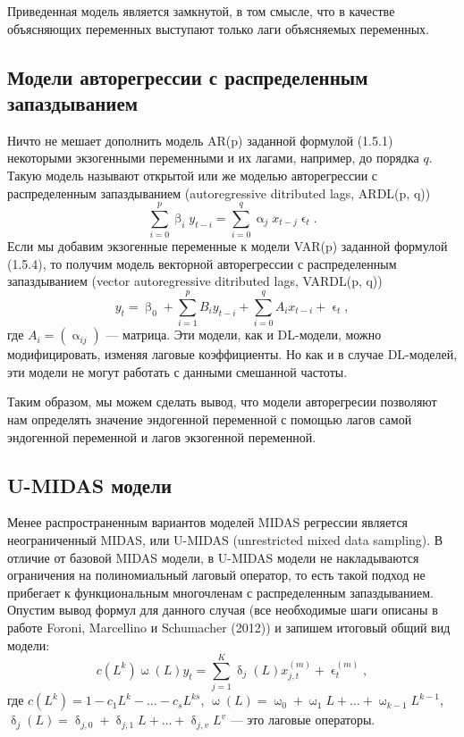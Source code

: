 \documentclass[a4paper, 12pt]{extarticle}
\numberwithin{equation}{subsection}
\renewcommand{\alpha}{\upalpha}
\renewcommand{\beta}{\upbeta}
\renewcommand{\delta}{\updelta}
\renewcommand{\omega}{\upomega}
\renewcommand{\epsilon}{\upvarepsilon}
\begin{document}
	Приведенная модель является замкнутой, в том смысле, что в качестве объясняющих переменных выступают только лаги объясняемых переменных. 
	\subsection{Модели авторегрессии с распределенным запаздыванием}
	Ничто не мешает дополнить модель AR(p) заданной формулой (1.5.1) некоторыми экзогенными переменными и их лагами, например, до порядка $q$. Такую модель называют открытой или же моделью авторегрессии с распределенным запаздыванием (autoregressive ditributed lags, ARDL(p, q))
	\begin{equation}
		\sum_{i=0}^{p} \beta_i y_{t-i}= \sum_{i=0}^{q}\alpha_j x_{t-j} \epsilon_t.
	\end{equation}
	Если мы добавим экзогенные переменные к модели VAR(p) заданной формулой (1.5.4), то получим модель векторной авторегрессии с распределенным запаздыванием (vector autoregressive ditributed lags, VARDL(p, q))
	\begin{equation}
		y_t = \beta_0 + \sum_{i=1}^{p}B_iy_{t-i} + \sum_{i=0}^{q}A_ix_{t-i} + \epsilon_t,
	\end{equation}
	где $A_i = (\alpha_{ij})$ --- матрица. Эти модели, как и DL-модели, можно модифицировать, изменяя лаговые коэффициенты. Но как и в случае DL-моделей, эти модели не могут работать с данными смешанной частоты.
	
	Таким образом, мы можем сделать вывод, что модели авторегресии позволяют нам определять значение эндогенной переменной с помощью лагов самой эндогенной переменной и лагов экзогенной переменной.
	\subsection{U-MIDAS модели}
	Менее распространенным вариантов моделей MIDAS регрессии является неограниченный MIDAS, или U-MIDAS (unrestricted mixed data sampling). В отличие от базовой MIDAS модели, в U-MIDAS модели не накладываются ограничения на полиномиальный лаговый оператор, то есть такой подход не прибегает к функциональным многочленам с распределенным запаздыванием. Опустим вывод формул для данного случая (все необходимые шаги описаны в работе Foroni, Marcellino и Schumacher (2012)) и запишем итоговый общий вид модели:
	\begin{equation}
		c(L^k)\omega(L)y_t = \sum_{j=1}^{K}\delta_j(L)x_{j,t}^{(m)} + \epsilon_t^{(m)},
	\end{equation}
	где $c(L^k) = 1-c_1L^k - \ldots - c_sL^{ks}$, $\omega(L) = \omega_0 + \omega_1L + \ldots + \omega_{k-1}L^{k-1}$, $\delta_j(L) = \delta_{j,0} + \delta_{j,1}L + \ldots + \delta_{j,v}L^v$ --- это лаговые операторы.
	
\end{document}
